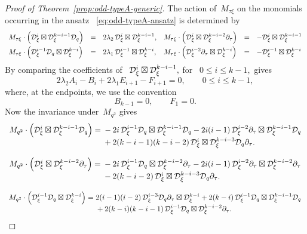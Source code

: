 \documentclass[12pt,a4paper]{amsart}
\theoremstyle{thm}
\theoremstyle{definition}
\newcommand {\Dq}{\cD_q}
\newcommand {\Dxi}{\cD_\xi}
\begin{document}
\begin{proof}[Proof of Theorem~\textup{\ref{prop:odd-typeA-generic}}]
The action of~\(M_{\tau\xi}\) on the  monomials occurring in the ansatz~%
\eqref{eq:odd-typeA-ansatz} is determined by
\[
\begin{array}{lcllcl}
M_{\tau\xi}\cdot
\left(
\Dxi^i\boxtimes \Dxi^{k-i-1}\Dq
\right)
&=&
2\lambda_2\,
\Dxi^i\boxtimes \Dxi^{k-i-1},
&
M_{\tau\xi}\cdot
\left(
\Dxi^i\boxtimes \Dxi^{k-i-2}\partial_\tau
\right)
&=&
-
\Dxi^i\boxtimes \Dxi^{k-i-1}
\\[2mm]
M_{\tau\xi}\cdot
\left(
\Dxi^{i-1}\Dq\boxtimes \Dxi^{k-i}
\right)
&=&
2\lambda_1\,
\Dxi^{i-1}\boxtimes \Dxi^{k-i},
&
M_{\tau\xi}\cdot
\left(
\Dxi^{i-2}\partial_\tau\boxtimes \Dxi^{k-i}
\right)
&=&
-
\Dxi^{i-1}\boxtimes \Dxi^{k-i}
\end{array}
\]
By comparing the coefficients of~%
$
\Dxi^i\boxtimes \Dxi^{k-i-1},
$ for~%
$0\leq i\leq k-1,$ gives
\begin{equation}
2\lambda_2A_i-B_i
+
2\lambda_1E_{i+1}-F_{i+1}
=
0,
\qquad
0\leq i\leq k-1,
\label{eq:odd-typeA-Mtauxi}
\end{equation}
where, at the endpoints, we use the convention
\[
B_{k-1}=0,
\qquad
F_1=0.
\]
Now the invariance under~\(M_{q^2}\) gives
\[
\begin{array}{r@{}l}
M_{q^2}\cdot
\left(
\Dxi^i\boxtimes \Dxi^{k-i-1}\Dq
\right)
={}&
{}-2i\,
\Dxi^{i-1}\Dq\boxtimes \Dxi^{k-i-1}\Dq
-
2i(i-1)\,
\Dxi^{i-2}\partial_\tau\boxtimes \Dxi^{k-i-1}\Dq
\\
&{}+
2(k-i-1)(k-i-2)\,
\Dxi^i\boxtimes \Dxi^{k-i-3}\Dq\partial_\tau .
\end{array}
\]

\[
\begin{array}{r@{}l}
M_{q^2}\cdot
\left(
\Dxi^i\boxtimes \Dxi^{k-i-2}\partial_\tau
\right)
={}&
{}-2i\,
\Dxi^{i-1}\Dq\boxtimes \Dxi^{k-i-2}\partial_\tau
-
2i(i-1)\,
\Dxi^{i-2}\partial_\tau\boxtimes \Dxi^{k-i-2}\partial_\tau
\\
&{}-
2(k-i-2)\,
\Dxi^i\boxtimes \Dxi^{k-i-3}\Dq\partial_\tau .
\end{array}
\]

\[
\begin{array}{r@{}l}
M_{q^2}\cdot
\left(
\Dxi^{i-1}\Dq\boxtimes \Dxi^{k-i}
\right)
={}&
2(i-1)(i-2)\,
\Dxi^{i-3}\Dq\partial_\tau\boxtimes \Dxi^{k-i}
+
2(k-i)\,
\Dxi^{i-1}\Dq\boxtimes \Dxi^{k-i-1}\Dq
\\
&{}+
2(k-i)(k-i-1)\,
\Dxi^{i-1}\Dq\boxtimes \Dxi^{k-i-2}\partial_\tau .
\end{array}
\]


\end{proof}
\end{document}
